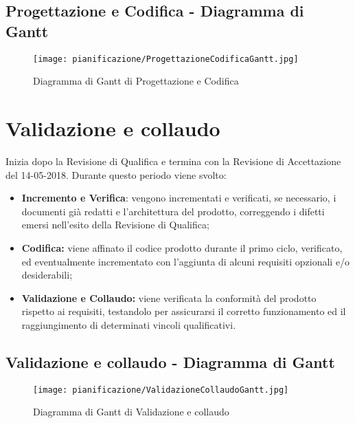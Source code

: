 \documentclass[../PianodiProgetto.tex]{subfiles}
\begin{document}
	\subsection{Progettazione e Codifica - Diagramma di Gantt}
	\begin{figure}[H]
		\texttt{[image: pianificazione/ProgettazioneCodificaGantt.jpg]}	
		\caption{Diagramma di Gantt di Progettazione e Codifica}\label{fig:4}	
	\end{figure}
	\newpage
	\section{Validazione e collaudo}
	Inizia dopo la Revisione di Qualifica e termina con la Revisione di Accettazione del 14-05-2018. Durante questo periodo viene svolto:
	\begin{itemize}
		\item \textbf{Incremento e Verifica}: vengono incrementati e verificati, se necessario, i documenti già redatti e l'architettura del prodotto, correggendo i difetti emersi nell'esito della Revisione di Qualifica;
		\item \textbf{Codifica:} viene affinato il codice prodotto durante il primo ciclo, verificato, ed eventualmente incrementato con l'aggiunta di alcuni requisiti opzionali e/o desiderabili;		
		\item \textbf{Validazione e Collaudo:} viene verificata la conformità del prodotto rispetto ai requisiti, testandolo per assicurarsi il corretto funzionamento ed il raggiungimento di determinati vincoli qualificativi.
		 
	\end{itemize}
	\subsection{Validazione e collaudo - Diagramma di Gantt}
	\begin{figure}[H]
		\texttt{[image: pianificazione/ValidazioneCollaudoGantt.jpg]}	
		\caption{Diagramma di Gantt di Validazione e collaudo}\label{fig:5}	
	\end{figure}
\end{document}
